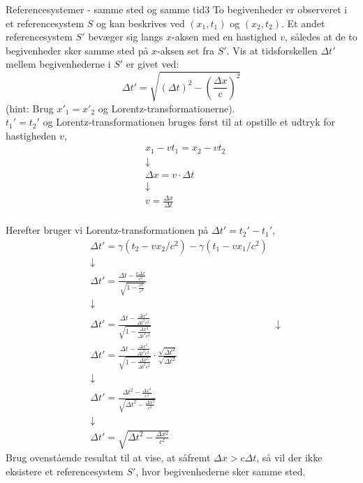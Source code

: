 \documentclass[crop=false, class=memoir]{standalone}
\begin{document}
\begin{opgave}{Referencesystemer - samme sted og samme tid}{3}
	To begivenheder er observeret i et referencesystem $S$ og kan beskrives ved $\left( x_1 , t_1 \right)$ og $\left( x_2 , t_2 \right)$. Et andet referencesystem $S'$ bevæger sig langs $x$-aksen med en hastighed $v$, således at de to begivenheder sker samme sted på $x$-aksen set fra $S'$.
	\opg Vis at tidsforskellen $\Delta t'$ mellem begivenhederne i $S'$ er givet ved:
	$$\Delta t' = \sqrt{\left( \Delta t \right)^2 - \left( \frac{\Delta x}{c} \right)^2}$$
	(hint: Brug $x'_1 = x'_2$ og Lorentz-transformationerne).\\
	
	$t_1'=t_2'$ og Lorentz-transformationen bruges først til at opstille et udtryk for hastigheden $v$,
	\begin{align*}
	&x_1-vt_1=x_2-vt_2 \\
	&\downarrow \\
	&\Delta x=v \cdot \Delta t \\
	&\downarrow \\
	&v=\frac{\Delta x}{\Delta t} \\
	\end{align*}
	
	Herefter bruger vi Lorentz-transformationen på $\Delta t'=t_2'-t_1'$,
	\begin{align*}
	&\Delta t'=\gamma(t_2-vx_2/c^2)-\gamma(t_1-vx_1/c^2) \\
	&\downarrow \\
	&\Delta t'=\frac{\Delta t-\frac{v\Delta x}{c^2}}{\sqrt{1-\frac{v^2}{c^2}}} \\
	&\downarrow \\
	&\Delta t'=\frac{\Delta t - \frac{\Delta x^2}{\Delta t^2c^2}}{\sqrt{1-\frac{\Delta x^2}{\Delta t^2c^2}}}
	&\downarrow \\
	&\Delta t'=\frac{\Delta t - \frac{\Delta x^2}{\Delta t^2c^2}}{\sqrt{1-\frac{\Delta x^2}{\Delta t^2c^2}}} \cdot \frac{\sqrt{\Delta t^2}}{\sqrt{\Delta t^2}} \\
	&\downarrow \\
	&\Delta t'=\frac{\Delta t^2-\frac{\Delta x^2}{c^2}}{\sqrt{\Delta t^2-\frac{\Delta x^2}{c^2}}} \\
	&\downarrow \\
	&\Delta t' = \sqrt{\Delta t^2-\frac{\Delta x^2}{c^2}}
	\end{align*}
	\opg Brug ovenstående resultat til at vise, at såfremt $\Delta x > c \Delta t$, så vil der ikke eksistere et referencesystem $S'$, hvor begivenhederne sker samme sted.\\
	

\end{opgave}
\end{document}
